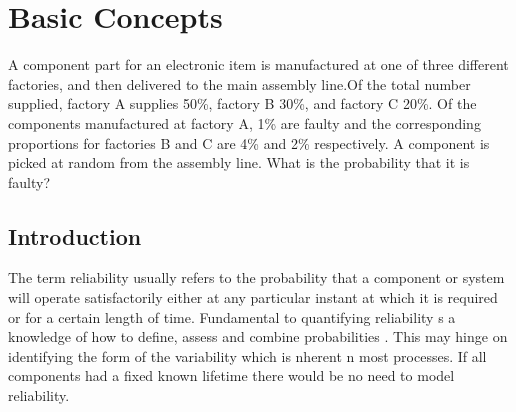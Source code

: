 \chapter{Basic Concepts}

A component part for an electronic item is
manufactured at one of three different factories, and then delivered to
the main assembly line.Of the total number supplied, factory A supplies
50\%, factory B 30\%, and factory C 20\%. Of the components
manufactured at factory A, 1\% are faulty and the corresponding
proportions for factories B and C are 4\% and 2\% respectively. A
component is picked at random from the assembly line. What is the
probability that it is faulty?

\section{Introduction}\label{intro}
The term reliability usually refers to the probability that a
component or system will operate satisfactorily either at any particular
instant at which it is required or for a certain length of
time. Fundamental to quantifying reliability s a knowledge of how to
define, assess and combine probabilities \cite{Bontempi2005Adaptive}. This may hinge on identifying the
form of the variability which is nherent n most processes. If all
components had a fixed known lifetime there would be no need to model
reliability.

